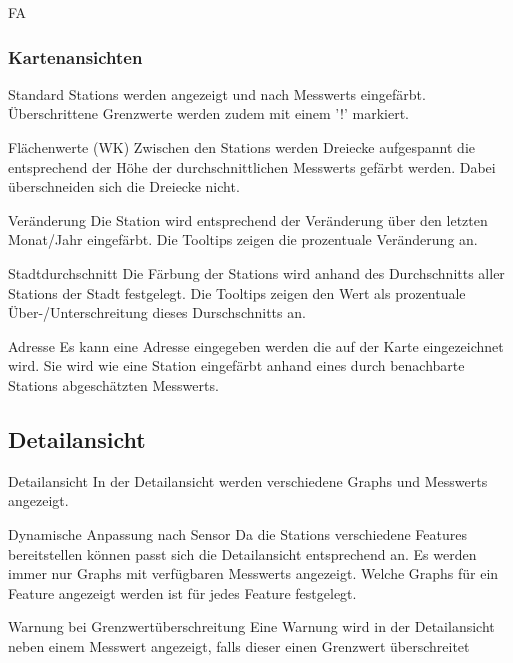 \begin{Kriterien}{FA}
 \subsubsection{Kartenansichten}

 \item[Standard]
  \glspl{Station} werden angezeigt und nach \glspl{Messwert} eingefärbt. 
  Überschrittene Grenzwerte werden zudem mit einem '!' markiert.

 \item[Flächenwerte (WK)]
   Zwischen den \glspl{Station} werden Dreiecke aufgespannt die entsprechend der Höhe der durchschnittlichen \glspl{Messwert} gefärbt werden.
   Dabei überschneiden sich die Dreiecke nicht.

 \item[Veränderung]
   Die \gls{Station} wird entsprechend der Veränderung über den letzten Monat/Jahr eingefärbt.
   Die \glspl{Tooltip} zeigen die prozentuale Veränderung an.

 \item[Stadtdurchschnitt]
  Die Färbung der \glspl{Station} wird anhand des Durchschnitts aller \glspl{Station} der Stadt festgelegt.
  Die \glspl{Tooltip} zeigen den Wert als prozentuale Über-/Unterschreitung dieses Durschschnitts an. 

 \item[Adresse]
   Es kann eine Adresse eingegeben werden die auf der Karte eingezeichnet wird.
   Sie wird wie eine \gls{Station} eingefärbt anhand eines durch benachbarte \glspl{Station} abgeschätzten \glspl{Messwert}.

\subsection{Detailansicht}

 \item[Detailansicht]
   In der Detailansicht werden verschiedene \glspl{Graph} und \glspl{Messwert} angezeigt. 

 \item[Dynamische Anpassung nach Sensor]
   Da die \glspl{Station} verschiedene \glspl{Feature} bereitstellen können passt sich die Detailansicht entsprechend an.
   Es werden immer nur \glspl{Graph} mit verfügbaren \glspl{Messwert} angezeigt.
   Welche \glspl{Graph} für ein \gls{Feature} angezeigt werden ist für jedes \gls{Feature} festgelegt.

 \item[Warnung bei Grenzwertüberschreitung]
  Eine Warnung wird in der Detailansicht neben einem \gls{Messwert} angezeigt, falls dieser einen Grenzwert überschreitet


\end{Kriterien}
